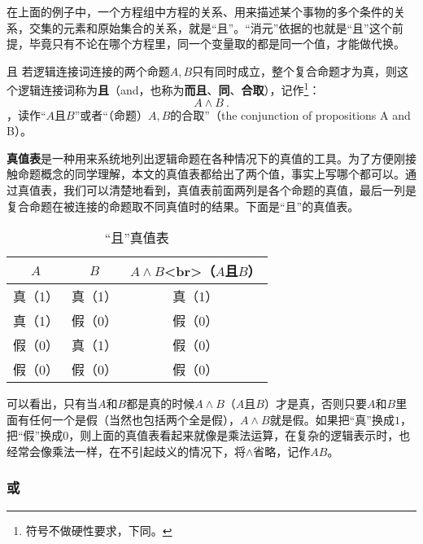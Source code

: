 在上面的例子中，一个方程组中方程的关系、用来描述某个事物的多个条件的关系，交集的元素和原始集合的关系，就是“且”。“消元”依据的也就是“且”这个前提，毕竟只有不论在哪个方程里，同一个变量取的都是同一个值，才能做代换。
\begin{definition}{且}\label{def_HsCoPr_1}
若逻辑连接词连接的两个命题$A,B$只有同时成立，整个复合命题才为真，则这个逻辑连接词称为\textbf{且}（and，也称为\textbf{而且}、\textbf{同}、\textbf{合取}），记作\footnote{符号不做硬性要求，下同。}：
\begin{equation}
A\land B~.
\end{equation}
，读作“$A$且$B$”或者“（命题）$A,B$的合取”（the conjunction of propositions A and B）。
\end{definition}

\textbf{真值表}是一种用来系统地列出逻辑命题在各种情况下的真值的工具。为了方便刚接触命题概念的同学理解，本文的真值表都给出了两个值，事实上写哪个都可以。通过真值表，我们可以清楚地看到，真值表前面两列是各个命题的真值，最后一列是复合命题在被连接的命题取不同真值时的结果。下面是“且”的真值表。

\begin{table}[ht]
\centering
\caption{“且”真值表}\label{tab_HsCoPr1}
\begin{tabular}{|c|c|c|}
\hline
$A$ & $B$ & $A \land B$<br>（$A$且$B$） \\
\hline
真（1） & 真（1） & 真（1） \\
\hline
真（1） & 假（0） & 假（0）\\
\hline
假（0） & 真（1） & 假（0）\\
\hline
假（0） & 假（0） & 假（0） \\
\hline
\end{tabular}
\end{table}

可以看出，只有当$A$和$B$都是真的时候$A\land B$（$A$且$B$）才是真，否则只要$A$和$B$里面有任何一个是假（当然也包括两个全是假），$A\land B$就是假。如果把“真”换成$1$，把“假”换成$0$，则上面的真值表看起来就像是乘法运算，在复杂的逻辑表示时，也经常会像乘法一样，在不引起歧义的情况下，将$\land$省略，记作$AB$。

\subsubsection{或}

